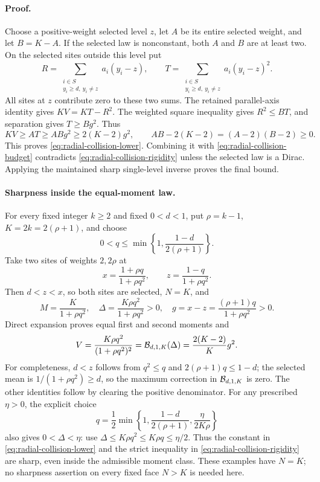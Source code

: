 \paragraph{Proof.}
Choose a positive-weight selected level \(z\), let \(A\) be its
entire selected weight, and let \(B=K-A\).  If the selected law is
nonconstant, both \(A\) and \(B\) are at least two.  On the selected
sites outside this level put
\[
 R=\sum_{\substack{i\in S\\y_i\ge d,\ y_i\ne z}}a_i(y_i-z),
 \qquad
 T=\sum_{\substack{i\in S\\y_i\ge d,\ y_i\ne z}}a_i(y_i-z)^2.
\]
All sites at \(z\) contribute zero to these two sums.  The retained
parallel-axis identity gives \(KV=KT-R^2\).  The weighted square
inequality gives \(R^2\le BT\), and separation gives \(T\ge Bg^2\).
Thus
\[
 KV\ge AT\ge ABg^2\ge2(K-2)g^2,
 \qquad
 AB-2(K-2)=(A-2)(B-2)\ge0.
\]
This proves \eqref{eq:radial-collision-lower}.  Combining it with
\eqref{eq:radial-collision-budget} contradicts
\eqref{eq:radial-collision-rigidity} unless the selected law is a
Dirac.  Applying the maintained sharp single-level inverse proves
the final bound.

\paragraph{Sharpness inside the equal-moment law.}
For every fixed integer \(k\ge2\) and fixed \(0<d<1\), put
\(\rho=k-1\), \(K=2k=2(\rho+1)\), and choose
\[
 0<q\le\min\left\{1,\frac{1-d}{2(\rho+1)}\right\}.
\]
Take two sites of weights \(2,2\rho\) at
\[
 x=\frac{1+\rho q}{1+\rho q^2},\qquad
 z=\frac{1-q}{1+\rho q^2}.
\]
Then \(d<z<x\), so both sites are selected, \(N=K\), and
\[
 M=\frac K{1+\rho q^2},\quad
 \Delta=\frac{K\rho q^2}{1+\rho q^2}>0,\quad
 g=x-z=\frac{(\rho+1)q}{1+\rho q^2}>0.
\]
Direct expansion proves equal first and second moments and
\[
 V=\frac{K\rho q^2}{(1+\rho q^2)^2}
   ={\cal B}_{d,1,K}(\Delta)
   =\frac{2(K-2)}K g^2.
\]
For completeness, \(d<z\) follows from \(q^2\le q\) and
\(2(\rho+1)q\le1-d\); the selected mean is
\(1/(1+\rho q^2)\ge d\), so the maximum correction in
\({\cal B}_{d,1,K}\) is zero.  The other identities follow by
clearing the positive denominator.
For any prescribed \(\eta>0\), the explicit choice
\[
 q=\frac12\min\left\{1,\frac{1-d}{2(\rho+1)},
                           \frac{\eta}{2K\rho}\right\}
\]
also gives \(0<\Delta<\eta\): use
\(\Delta\le K\rho q^2\le K\rho q\le\eta/2\).
Thus the constant in \eqref{eq:radial-collision-lower} and the strict
inequality in \eqref{eq:radial-collision-rigidity} are sharp, even
inside the admissible moment class.  These examples have \(N=K\);
no sharpness assertion on every fixed face \(N>K\) is needed here.

